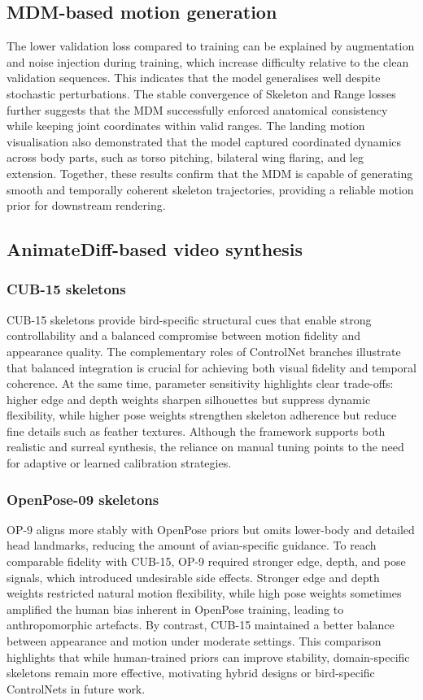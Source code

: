 \documentclass[final-report]{report-template}
\begin{document}
\subsection{MDM-based motion generation}
The lower validation loss compared to training can be explained by augmentation and noise injection during training, which increase difficulty relative to the clean validation sequences. 
This indicates that the model generalises well despite stochastic perturbations.  
The stable convergence of Skeleton and Range losses further suggests that the MDM successfully enforced anatomical consistency while keeping joint coordinates within valid ranges. 
The landing motion visualisation also demonstrated that the model captured coordinated dynamics across body parts, such as torso pitching, bilateral wing flaring, and leg extension.  
Together, these results confirm that the MDM is capable of generating smooth and temporally coherent skeleton trajectories, providing a reliable motion prior for downstream rendering.

\subsection{AnimateDiff-based video synthesis}

\subsubsection{CUB-15 skeletons}
CUB-15 skeletons provide bird-specific structural cues that enable strong controllability and a balanced compromise between motion fidelity and appearance quality. 
The complementary roles of ControlNet branches illustrate that balanced integration is crucial for achieving both visual fidelity and temporal coherence.  
At the same time, parameter sensitivity highlights clear trade-offs: higher edge and depth weights sharpen silhouettes but suppress dynamic flexibility, while higher pose weights strengthen skeleton adherence but reduce fine details such as feather textures.  
Although the framework supports both realistic and surreal synthesis, the reliance on manual tuning points to the need for adaptive or learned calibration strategies.

\subsubsection{OpenPose-09 skeletons}
OP-9 aligns more stably with OpenPose priors but omits lower-body and detailed head landmarks, reducing the amount of avian-specific guidance. 
To reach comparable fidelity with CUB-15, OP-9 required stronger edge, depth, and pose signals, which introduced undesirable side effects. 
Stronger edge and depth weights restricted natural motion flexibility, while high pose weights sometimes amplified the human bias inherent in OpenPose training, leading to anthropomorphic artefacts.  
By contrast, CUB-15 maintained a better balance between appearance and motion under moderate settings.  
This comparison highlights that while human-trained priors can improve stability, domain-specific skeletons remain more effective, motivating hybrid designs or bird-specific ControlNets in future work.
\end{document}

